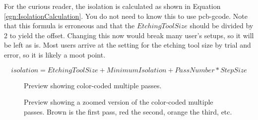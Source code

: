 \documentclass[11pt]{book}
\begin{document}
\howitworks{}
For the curious reader, the isolation is calculated as shown in Equation \vref{egn:IsolationCalculation}. You do not need to know this to use pcb-gcode. Note that this formula is erroneous and that the $EtchingToolSize$ should be divided by 2 to yield the offset. Changing this now would break many user's setups, so it will be left as is. Most users arrive at the setting for the etching tool size by trial and error, so it is likely a moot point.

\begin{equation}
isolation = EtchingToolSize+MinimumIsolation+PassNumber*StepSize
\label{egn:IsolationCalculation}
\end{equation}


\begin{figure}
	\caption{Preview showing color-coded multiple passes.}
	\label{fig:MultipassBoard}
\end{figure}

\begin{figure}
	\caption{Preview showing a zoomed version of the color-coded multiple passes. Brown is the first pass, red the second, orange the third, etc.}
	\label{fig:MultipassBoardZoom}
\end{figure}
\end{document}
